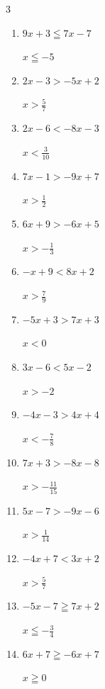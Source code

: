 \begin{multicols}{3}
\begin{enumerate}
\columnbreak %

\resetques

  \item $9x+3\leqq 7x-7$

        $\displaystyle x\leqq -5$

  \item $2x-3>-5x+2$

        $\displaystyle x>\frac{5}{7}$

  \item $2x-6<-8x-3$

        $\displaystyle x<\frac{3}{10}$

  \item $7x-1>-9x+7$

        $\displaystyle x>\frac{1}{2}$

  \item $6x+9>-6x+5$

        $\displaystyle x>-\frac{1}{3}$

  \item $-x+9<8x+2$

        $\displaystyle x>\frac{7}{9}$

  \item $-5x+3>7x+3$

        $\displaystyle x<0$

  \item $3x-6<5x-2$

        $\displaystyle x>-2$

  \item $-4x-3>4x+4$

        $\displaystyle x<-\frac{7}{8}$

  \item $7x+3>-8x-8$

        $\displaystyle x>-\frac{11}{15}$

  \item $5x-7>-9x-6$

        $\displaystyle x>\frac{1}{14}$

  \item $-4x+7<3x+2$

        $\displaystyle x>\frac{5}{7}$

  \item $-5x-7\geqq 7x+2$

        $\displaystyle x\leqq -\frac{3}{4}$

  \item $6x+7\geqq -6x+7$

        $\displaystyle x\geqq 0$


\end{enumerate}
\end{multicols}
